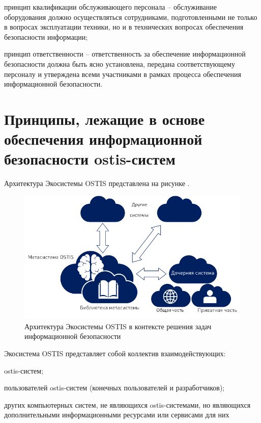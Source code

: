 \begin{textitemize}
	\item принцип квалификации обслуживающего персонала -- обслуживание оборудования должно осуществляться сотрудниками, подготовленными не только в вопросах эксплуатации техники, но и в технических вопросах обеспечения безопасности информации;
	\item принцип ответственности -- ответственность за обеспечение информационной безопасности должна быть ясно установлена, передана соответствующему персоналу и утверждена всеми участниками в рамках процесса обеспечения информационной безопасности.
\end{textitemize}

\section{Принципы, лежащие в основе обеспечения информационной безопасности ostis-систем}

Архитектура Экосистемы OSTIS представлена на рисунке \textit{}.

\begin{figure}[H]
	\includegraphics[scale=0.9]{images/part7/chapter_security/ecosystem_security.png}
	\caption{Архитектура Экосистемы OSTIS в контексте решения задач информационной безопасности}
	\label{fig:ecosystem_security}
\end{figure}

Экосистема OSTIS представляет собой коллектив взаимодействующих:

\begin{textitemize}
	\item ostis-систем;
	\item пользователей ostis-систем (конечных пользователей и разработчиков);
	\item других компьютерных систем, не являющихся ostis-системами, но являющихся дополнительными информационными ресурсами или сервисами для них
\end{textitemize}

